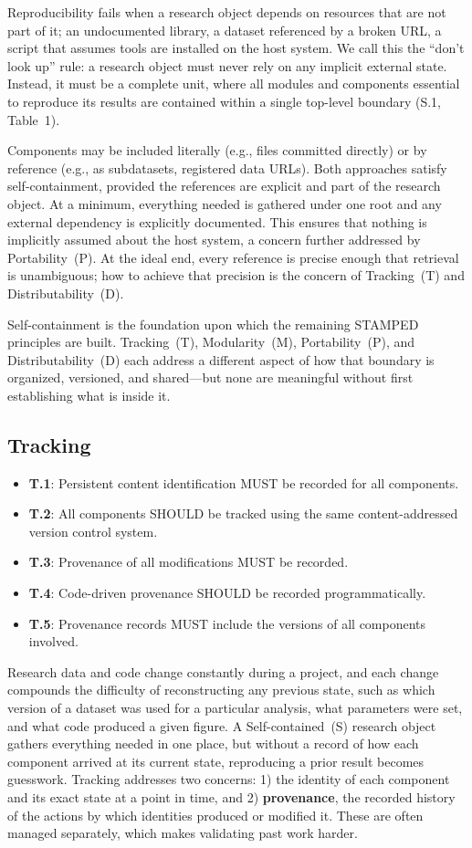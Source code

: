 \documentclass{article}
\makeatletter
\newcommand{\hyanchor}[1]{\texorpdfstring{\Hy@raisedlink{\hypertarget{#1}{}}}{}}
\newcommand{\anchoredsubsection}[2]{\subsection[#2]{\hyanchor{#1}#2}}
\makeatother
\begin{document}
Reproducibility fails when a research object depends on resources that are not part of it; an undocumented library, a dataset referenced by a broken URL, a script that assumes tools are installed on the host system.
We call this the ``don't look up'' rule: a research object must never rely on any implicit external state.
Instead, it must be a complete unit, where all modules and components essential to reproduce its results are contained within a single top-level boundary (S.1, Table~1).

Components may be included literally (e.g., files committed directly) or by reference (e.g., as subdatasets, registered data URLs).
Both approaches satisfy self-containment, provided the references are explicit and part of the research object.
At a minimum, everything needed is gathered under one root and any external dependency is explicitly documented.
This ensures that nothing is implicitly assumed about the host system, a concern further addressed by Portability~(P).
At the ideal end, every reference is precise enough that retrieval is unambiguous; how to achieve that precision is the concern of Tracking~(T) and Distributability~(D).

Self-containment is the foundation upon which the remaining STAMPED principles are built.
Tracking~(T), Modularity~(M), Portability~(P), and Distributability~(D) each address a different aspect of how that boundary is organized, versioned, and shared---but none are meaningful without first establishing what is inside it.



\anchoredsubsection{tracking}{Tracking}

\begin{itemize}
    \item \textbf{T.1}: Persistent content identification MUST be recorded for all components.
    \item \textbf{T.2}: All components SHOULD be tracked using the same content-addressed version control system.
    \item \textbf{T.3}: Provenance of all modifications MUST be recorded.
    \item \textbf{T.4}: Code-driven provenance SHOULD be recorded programmatically.
    \item \textbf{T.5}: Provenance records MUST include the versions of all components involved.
\end{itemize}

Research data and code change constantly during a project, and each change compounds the difficulty of reconstructing any previous state, such as which version of a dataset was used for a particular analysis, what parameters were set, and what code produced a given figure.
A Self-contained~(S) research object gathers everything needed in one place, but without a record of how each component arrived at its current state, reproducing a prior result becomes guesswork.
Tracking addresses two concerns: 1) the identity of each component and its exact state at a point in time, and 2) \textbf{provenance}, the recorded history of the actions by which identities produced or modified it.
These are often managed separately, which makes validating past work harder.
\end{document}
